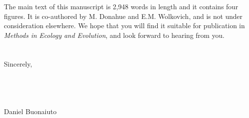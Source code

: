 \documentclass[11.5 pt]{article}
\begin{document}
\noindent The main text of this manuscript is 2,948 words in length and it contains four figures. It is co-authored by M. Donahue and E.M. Wolkovich, and is not under consideration elsewhere. We hope that you will find it suitable for publication in \textit{Methods in Ecology and Evolution}, and look forward to hearing from you.\\\\ 
\\Sincerely,\\\\\\\\\\

\noindent Daniel Buonaiuto\\


\end{document}
